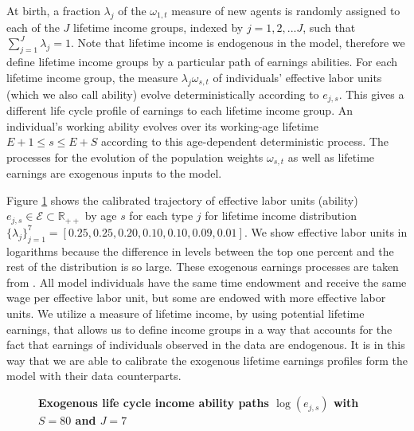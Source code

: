 \documentclass[letterpaper,12pt]{article}
\theoremstyle{definition}
\begin{document}
\begin{spacing}{1.5}
    At birth, a fraction $\lambda_j$ of the $\omega_{1,t}$ measure of new agents is randomly assigned to each of the $J$ lifetime income groups, indexed by $j=1,2,...J$, such that $\sum_{j=1}^J\lambda_j=1$. Note that lifetime income is endogenous in the model, therefore we define lifetime income groups by a particular path of earnings abilities. For each lifetime income group, the measure $\lambda_j\omega_{s,t}$ of individuals' effective labor units (which we also call ability) evolve deterministically according to $e_{j,s}$. This gives a different life cycle profile of earnings to each lifetime income group.  An individual's working ability evolves over its working-age lifetime $E+1\leq s \leq E+S$ according to this age-dependent deterministic process. The processes for the evolution of the population weights $\omega_{s,t}$ as well as lifetime earnings are exogenous inputs to the model.

    Figure \ref{FigLogAbility} shows the calibrated trajectory of effective labor units (ability) $e_{j,s}\in\mathcal{E}\subset\mathbb{R}_{++}$ by age $s$ for each type $j$ for lifetime income distribution $\{\lambda_j\}_{j=1}^7 = [0.25,0.25,0.20,0.10,0.10,0.09,0.01]$. We show effective labor units in logarithms because the difference in levels between the top one percent and the rest of the distribution is so large. These exogenous earnings processes are taken from \citet{DEMPRW2015}.  All model individuals have the same time endowment and receive the same wage per effective labor unit, but some are endowed with more effective labor units. We utilize a measure of lifetime income, by using potential lifetime earnings, that allows us to define income groups in a way that accounts for the fact that earnings of individuals observed in the data are endogenous.  It is in this way that we are able to calibrate the exogenous lifetime earnings profiles form the model with their data counterparts.

    \begin{figure}[htb]\centering \captionsetup{width=4.0in}
      \caption{\label{FigLogAbility}\textbf{Exogenous life cycle income ability paths $\log(e_{j,s})$ with $S=80$ and $J=7$}}
    \end{figure}



\end{spacing}
\end{document}

